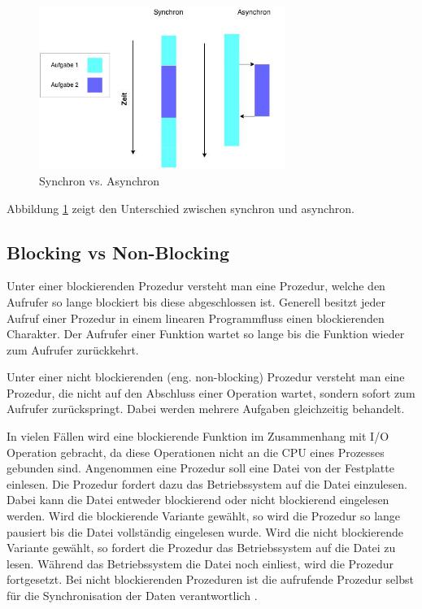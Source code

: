 \begin{figure}[!htb]
  \centering
  \includegraphics[width=8cm]{images/synchron_vs_asynchron.jpg}
  \caption{
    Synchron vs. Asynchron
  }
  \label{figure:syncron_vs_async_}
\end{figure}

Abbildung \ref{figure:syncron_vs_async_} zeigt den Unterschied zwischen synchron und asynchron. 

\subsection{Blocking vs Non-Blocking}

Unter einer blockierenden Prozedur versteht man eine Prozedur, welche den Aufrufer so lange blockiert bis diese abgeschlossen ist. Generell besitzt jeder Aufruf einer Prozedur in einem linearen Programmfluss einen blockierenden Charakter. Der Aufrufer einer Funktion wartet so lange bis die Funktion wieder zum Aufrufer zurückkehrt. 

Unter einer nicht blockierenden (eng. non-blocking) Prozedur versteht man eine Prozedur, die nicht auf den Abschluss einer Operation wartet, sondern sofort zum Aufrufer zurückspringt. Dabei werden mehrere Aufgaben gleichzeitig behandelt.  

In vielen Fällen wird eine blockierende Funktion im Zusammenhang mit I/O Operation gebracht, da diese Operationen nicht an die CPU eines Prozesses gebunden sind. Angenommen eine Prozedur soll eine Datei von der Festplatte einlesen. Die Prozedur fordert dazu das Betriebssystem auf die Datei einzulesen. Dabei kann die Datei entweder blockierend oder nicht blockierend eingelesen werden. Wird die blockierende Variante gewählt, so wird die Prozedur so lange pausiert bis die Datei vollständig eingelesen wurde. Wird die nicht blockierende Variante gewählt, so fordert die Prozedur das Betriebssystem auf die Datei zu lesen. Während das Betriebssystem die Datei noch einliest, wird die Prozedur fortgesetzt. Bei nicht blockierenden Prozeduren ist die aufrufende Prozedur selbst für die Synchronisation der Daten verantwortlich \cite[p. 47]{Erb2012}.

